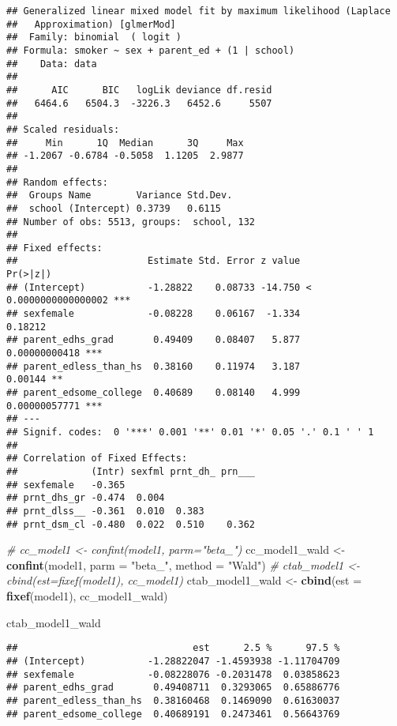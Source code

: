 \documentclass[]{article}
\newenvironment{Shaded}{\begin{snugshade}}{\end{snugshade}}
\newcommand{\CommentTok}[1]{\textcolor[rgb]{0.56,0.35,0.01}{\textit{#1}}}
\newcommand{\DataTypeTok}[1]{\textcolor[rgb]{0.13,0.29,0.53}{#1}}
\newcommand{\KeywordTok}[1]{\textcolor[rgb]{0.13,0.29,0.53}{\textbf{#1}}}
\newcommand{\NormalTok}[1]{#1}
\newcommand{\StringTok}[1]{\textcolor[rgb]{0.31,0.60,0.02}{#1}}
\begin{document}
\begin{verbatim}
## Generalized linear mixed model fit by maximum likelihood (Laplace
##   Approximation) [glmerMod]
##  Family: binomial  ( logit )
## Formula: smoker ~ sex + parent_ed + (1 | school)
##    Data: data
## 
##      AIC      BIC   logLik deviance df.resid 
##   6464.6   6504.3  -3226.3   6452.6     5507 
## 
## Scaled residuals: 
##     Min      1Q  Median      3Q     Max 
## -1.2067 -0.6784 -0.5058  1.1205  2.9877 
## 
## Random effects:
##  Groups Name        Variance Std.Dev.
##  school (Intercept) 0.3739   0.6115  
## Number of obs: 5513, groups:  school, 132
## 
## Fixed effects:
##                       Estimate Std. Error z value             Pr(>|z|)    
## (Intercept)           -1.28822    0.08733 -14.750 < 0.0000000000000002 ***
## sexfemale             -0.08228    0.06167  -1.334              0.18212    
## parent_edhs_grad       0.49409    0.08407   5.877        0.00000000418 ***
## parent_edless_than_hs  0.38160    0.11974   3.187              0.00144 ** 
## parent_edsome_college  0.40689    0.08140   4.999        0.00000057771 ***
## ---
## Signif. codes:  0 '***' 0.001 '**' 0.01 '*' 0.05 '.' 0.1 ' ' 1
## 
## Correlation of Fixed Effects:
##             (Intr) sexfml prnt_dh_ prn___
## sexfemale   -0.365                       
## prnt_dhs_gr -0.474  0.004                
## prnt_dlss__ -0.361  0.010  0.383         
## prnt_dsm_cl -0.480  0.022  0.510    0.362
\end{verbatim}

\begin{Shaded}
\begin{Highlighting}[]
\CommentTok{# cc_model1 <- confint(model1, parm="beta_") }
\NormalTok{cc_model1_wald <-}\StringTok{ }\KeywordTok{confint}\NormalTok{(model1, }\DataTypeTok{parm =} \StringTok{"beta_"}\NormalTok{, }\DataTypeTok{method =} \StringTok{"Wald"}\NormalTok{)}
\CommentTok{# ctab_model1 <- cbind(est=fixef(model1), cc_model1)}
\NormalTok{ctab_model1_wald <-}\StringTok{ }\KeywordTok{cbind}\NormalTok{(}\DataTypeTok{est =} \KeywordTok{fixef}\NormalTok{(model1), cc_model1_wald)}

\NormalTok{ctab_model1_wald}
\end{Highlighting}
\end{Shaded}

\begin{verbatim}
##                               est      2.5 %      97.5 %
## (Intercept)           -1.28822047 -1.4593938 -1.11704709
## sexfemale             -0.08228076 -0.2031478  0.03858623
## parent_edhs_grad       0.49408711  0.3293065  0.65886776
## parent_edless_than_hs  0.38160468  0.1469090  0.61630037
## parent_edsome_college  0.40689191  0.2473461  0.56643769
\end{verbatim}
\end{document}
